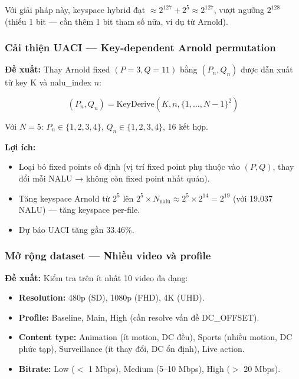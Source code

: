 Với giải pháp này, keyspace hybrid đạt $\approx 2^{127} + 2^5 \approx 2^{127}$,
vượt ngưỡng $2^{128}$ (thiếu 1 bit --- cần thêm 1 bit tham số nữa, ví dụ từ Arnold).

\subsubsection{Cải thiện UACI --- Key-dependent Arnold permutation}

\textbf{Đề xuất:} Thay Arnold fixed $(P=3, Q=11)$ bằng $(P_n, Q_n)$ được dẫn xuất
từ key K và nalu\_index $n$:

\begin{equation}
(P_n, Q_n) = \text{KeyDerive}(K, n, \{1,\ldots,N-1\}^2)
\end{equation}

Với $N = 5$: $P_n \in \{1, 2, 3, 4\}$, $Q_n \in \{1, 2, 3, 4\}$, 16 kết hợp.

\textbf{Lợi ích:}
\begin{itemize}
  \item Loại bỏ fixed points cố định (vị trí fixed point phụ thuộc vào $(P, Q)$,
        thay đổi mỗi NALU → không còn fixed point nhất quán).
  \item Tăng keyspace Arnold từ $2^5$ lên $2^5 \times N_{\text{nalu}} \approx 2^5 \times 2^{14} = 2^{19}$
        (với 19.037 NALU) --- tăng keyspace per-file.
  \item Dự báo UACI tăng gần $33.46\%$.
\end{itemize}

\subsubsection{Mở rộng dataset --- Nhiều video và profile}

\textbf{Đề xuất:} Kiểm tra trên ít nhất 10 video đa dạng:
\begin{itemize}
  \item \textbf{Resolution:} 480p (SD), 1080p (FHD), 4K (UHD).
  \item \textbf{Profile:} Baseline, Main, High (cần resolve vấn đề DC\_OFFSET).
  \item \textbf{Content type:} Animation (ít motion, DC đều), Sports (nhiều motion,
        DC phức tạp), Surveillance (ít thay đổi, DC ổn định), Live action.
  \item \textbf{Bitrate:} Low ($<$ 1 Mbps), Medium (5--10 Mbps), High ($>$ 20 Mbps).
\end{itemize}

